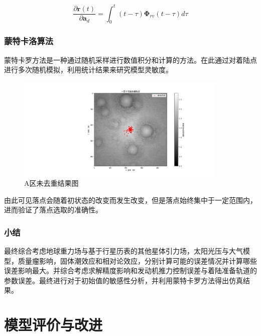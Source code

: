\documentclass{ctexart}
\begin{document}
\[
\frac{\partial \mathbf{r}(t)}{\partial \mathbf{a}_d} = \int_{0}^{t} (t-\tau) \mathbf{\Phi}_{rv}(t-\tau) d\tau
\]

\subsubsection{蒙特卡洛算法}
蒙特卡罗方法是一种通过随机采样进行数值积分和计算的方法。在此通过对着陆点进行多次随机模拟，利用统计结果来研究模型灵敏度。

    \begin{figure}[H] %
        \centering %
        \includegraphics[width=0.9\textwidth]{"./picture/Figure_100.png"} %
        \caption{A区未去重结果图} %
        \label{fig:example} %
    \end{figure}

由此可见落点会随着初状态的改变而发生改变，但是落点始终集中于一定范围内，进而验证了落点选取的准确性。

\subsubsection{小结}

最终综合考虑地球重力场与基于行星历表的其他星体引力场，太阳光压与大气模型，质量瘤影响，固体潮效应和相对论效应，分别计算可能的误差情况并计算哪些误差影响最大。并综合考虑求解精度影响和发动机推力控制误差与着陆准备轨道的参数误差。最终进行对于初始值的敏感性分析，并利用蒙特卡罗方法得出仿真结果。

\section{模型评价与改进}
\end{document}
